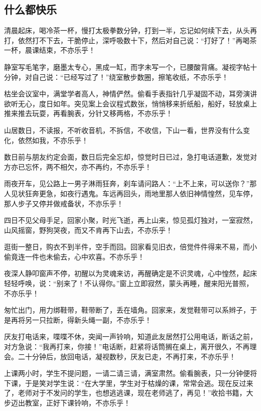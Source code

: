 \subsection{什么都快乐}

\par 清晨起床，喝冷茶一杯，慢打太极拳数分钟，打到一半，忘记如何续下去，从头再打，依然打不下去，干脆停止，深呼吸数十下，然后对自己说：“打好了！”再喝茶一杯，晨课结束，不亦乐乎！
\par 静室写毛笔字，磨墨太专心，黑成一缸，而字未写一个，已腰酸背痛。凝视字帖十分钟，对自己说：“已经写过了！”绕室散步数圈，擦笔收纸，不亦乐乎！
\par 枯坐会议室中，满堂学者高人，神情俨然。偷看手表指针几乎凝固不动，耳旁演讲欲听无心，度日如年。突见案上会议程式数张，悄悄移来折纸船，船好，轻放桌上推来推去玩耍，再看腕表，分针又移两格，不亦乐乎！
\par 山居数日，不读报，不听收音机，不拆信，不收信，下山一看，世界没有什么变化，依然如我，不亦乐乎！
\par 数日前与朋友约定会面，数日后完全忘却，惊觉时日已过，急打电话道歉，发觉对方亦已忘怀，两不相欠，亦不再约，不亦乐乎！
\par 雨夜开车，见公路上一男子淋雨狂奔，刹车请问路人：“上不上来，可以送你？”那人见状狂奔更急，如夜行遇鬼。车远再回头，雨地里那人依旧神情惶然，见车停，那人步子又停并做戒备状，不亦乐乎！
\par 四日不见父母手足，回家小聚，时光飞逝，再上山来，惊见孤灯独对，一室寂然，山风摇窗，野狗哭夜，而又不肯再下山去，不亦乐乎！
\par 逛街一整日，购衣不到半件，空手而回。回家看见旧衣，倍觉件件得来不易，而小偷竟连一件也未偷去，心中欢喜。不亦乐乎！
\par 夜深人静叩窗声不停，初醒以为灵魂来访，再醒确定是不识灵魂，心中惶然，起床轻轻呼唤，说：“别来了！不认得你。”窗上立即寂然，蒙头再睡，醒来阳光普照，不亦乐乎！
\par 匆忙出门，用力绑鞋带，鞋带断了，丢在墙角。回家来，发觉鞋带可以系辫子，于是再将另一只拉断，得新头绳一副，不亦乐乎！
\par 厌友打电话来，喋喋不休，突闻一声铃响，知道此友居然打公用电话，断话之前，对方急说：“我再打来，你接！”电话断，赶紧将话筒搁在桌上，离开很久，不再理会。二十分钟后，放回电话，凝视数秒，厌友已走，不再打来，不亦乐乎！
\par 上课两小时，学生不提问题，一请二请三请，满室肃然。偷看腕表，只一分钟便将下课，于是笑对学生说：“在大学里，学生对于枯燥的课，常常会逃。现在反过来了，老师对于不发问的学生，也想逃逃课，现在老师逃了，再见！”收拾书籍，大步迈出教室，正好下课铃响，不亦乐乎！
